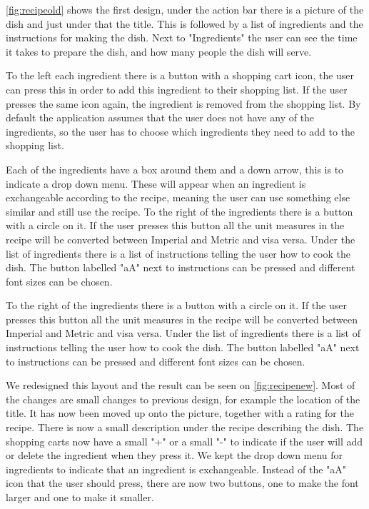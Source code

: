 \autoref{fig:recipeold} shows the first design, under the action bar there is a picture of the dish and just under that the title. This is followed by a list of ingredients and the instructions for making the dish. Next to "Ingredients" the user can see the time it takes to prepare the dish, and how many people the dish will serve.

To the left each ingredient there is a button with a shopping cart icon, the user can press this in order to add this ingredient to their shopping list. If the user presses the same icon again, the ingredient is removed from the shopping list. By default the application assumes that the user does not have any of the ingredients, so the user has to choose which ingredients they need to add to the shopping list.

Each of the ingredients have a box around them and a down arrow, this is to indicate a drop down menu. These will appear when an ingredient is exchangeable according to the recipe, meaning the user can use something else similar and still use the recipe. To the right of the ingredients there is a button with a circle on it. If the user presses this button all the unit measures in the recipe will be converted between Imperial and Metric and visa versa. Under the list of ingredients there is a list of instructions telling the user how to cook the dish. The button labelled "aA" next to instructions can be pressed and different font sizes can be chosen.

To the right of the ingredients there is a button with a circle on it. If the user presses this button all the unit measures in the recipe will be converted between Imperial and Metric and visa versa. Under the list of ingredients there is a list of instructions telling the user how to cook the dish. The button labelled "aA" next to instructions can be pressed and different font sizes can be chosen.

We redesigned this layout and the result can be seen on \autoref{fig:recipenew}. Most of the changes are small changes to previous design, for example the location of the title. It has now been moved up onto the picture, together with a rating for the recipe. There is now a small description under the recipe describing the dish. The shopping carts now have a small "+" or a small "-" to indicate if the user will add or delete the ingredient when they press it. We kept the drop down menu for ingredients to indicate that an ingredient is exchangeable. Instead of the "aA" icon that the user should press, there are now two buttons, one to make the font larger and one to make it smaller.

